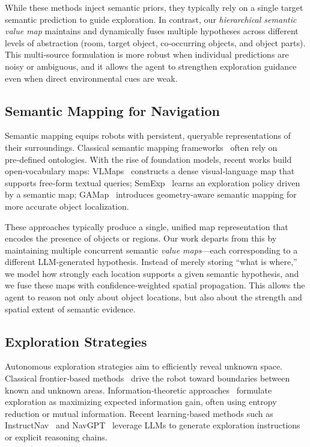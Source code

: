 \documentclass[conference]{IEEEtran}
\begin{document}
While these methods inject semantic priors, they typically rely on a single target semantic prediction  to guide exploration. In contrast, our \emph{hierarchical semantic value map} maintains and dynamically fuses multiple hypotheses across different levels of abstraction (room, target object, co‑occurring objects, and object parts). This multi‑source formulation is more robust when individual predictions are noisy or ambiguous, and it allows the agent to strengthen exploration guidance even when direct environmental cues are weak.

\subsection{Semantic Mapping for Navigation}

Semantic mapping equips robots with persistent, queryable representations of their surroundings. Classical semantic mapping frameworks~\cite{kostavelis2015semantic} often rely on pre‑defined ontologies. With the rise of foundation models, recent works build open‑vocabulary maps: VLMaps~\cite{huang2023vlmaps} constructs a dense visual‑language map that supports free‑form textual queries; SemExp~\cite{chaplot2020object} learns an exploration policy driven by a semantic map; GAMap~\cite{chen2024gamap} introduces geometry‑aware semantic mapping for more accurate object localization.

These approaches typically produce a single, unified map representation that encodes the presence of objects or regions. Our work departs from this by maintaining multiple concurrent semantic \emph{value maps}—each corresponding to a different LLM‑generated hypothesis. Instead of merely storing “what is where,” we model how strongly each location supports a given semantic hypothesis, and we fuse these maps with confidence‑weighted spatial propagation. This allows the agent to reason not only about object locations, but also about the strength and spatial extent of semantic evidence.

\subsection{Exploration Strategies}

Autonomous exploration strategies aim to efficiently reveal unknown space. Classical frontier‑based methods~\cite{yamauchi1997frontier} drive the robot toward boundaries between known and unknown areas. Information‑theoretic approaches~\cite{charrow2015information} formulate exploration as maximizing expected information gain, often using entropy reduction or mutual information. Recent learning‑based methods such as InstructNav~\cite{long2024instructnav} and NavGPT~\cite{zhou2024navgpt} leverage LLMs to generate exploration instructions or explicit reasoning chains.
\end{document}
